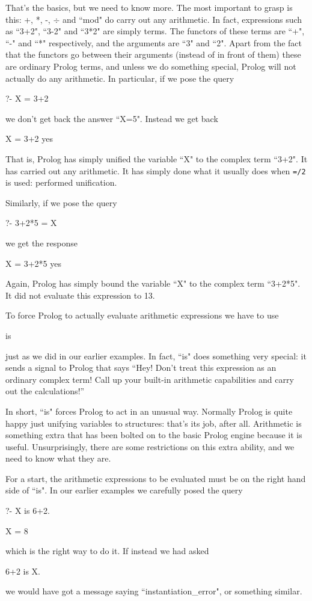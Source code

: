 That's the basics, but we need to know more.  The most important to
grasp is this: +, *, -, $\div$ and ``mod" do  carry out
any arithmetic.  In fact, expressions such as ``3+2", ``3-2" and ``3*2"
are simply terms.  The functors of these terms are ``+", ``-" and ``*"
respectively, and the arguments are ``3" and ``2".  Apart from the fact
that the functors go between their arguments (instead of in front of
them) these are ordinary Prolog terms, and unless we do something
special, Prolog will not actually do any arithmetic.  In
particular, if we pose the query
\begin{LPNcodedisplay}
?- X = 3+2
\end{LPNcodedisplay}
we don't get back the answer ``X=5".
Instead we get back
\begin{LPNcodedisplay}
X = 3+2
yes
\end{LPNcodedisplay}
That is, Prolog has simply unified the variable ``X" to the complex
term ``3+2".  It has  carried out any arithmetic.  It has
simply done what it usually does when \texttt{=/2} is used: performed
unification.

Similarly,
if we pose the query
\begin{LPNcodedisplay}
?- 3+2*5 = X
\end{LPNcodedisplay}
we get the response
\begin{LPNcodedisplay}
X = 3+2*5
yes
\end{LPNcodedisplay}
Again, Prolog has simply bound the variable ``X" to the complex
term ``3+2*5".  It did not evaluate this expression to 13.

To force Prolog to actually evaluate arithmetic expressions we have to
use
        \begin{LPNcodedisplay}
is
\end{LPNcodedisplay}
just as we did in our  earlier examples.  In fact, ``is" does
something very special: it sends a signal to Prolog that says ``Hey!
Don't treat this expression as an ordinary complex term!  Call up
your built-in arithmetic capabilities and carry out the calculations!''

In short, ``is" forces Prolog to act in an unusual way.  Normally
Prolog is quite happy just unifying variables to structures: that's
its job, after all.  Arithmetic is something extra that has been
bolted on to the basic Prolog engine because it is useful.
Unsurprisingly, there are some restrictions on this extra ability, and
we need to know what they are.

For a start, the arithmetic expressions to be evaluated must be on
the right hand side of ``is".  In our earlier examples we carefully
posed the query
\begin{LPNcodedisplay}
?- X is 6+2.

X = 8
\end{LPNcodedisplay}
which is the right way to do it. If instead we
had asked
\begin{LPNcodedisplay}
6+2 is X.
\end{LPNcodedisplay}
we would have got a message saying ``instantiation\_error",
or something similar.

